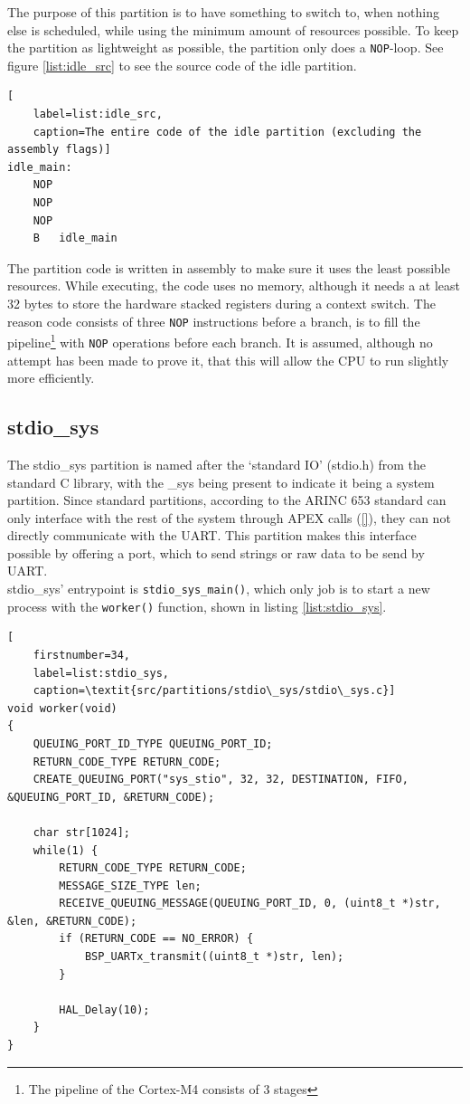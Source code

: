 The purpose of this partition is to have something to switch to, when nothing
else is scheduled, while using the minimum amount of resources possible.
To keep the partition as lightweight as possible, the partition only does a
\texttt{NOP}-loop. See figure \ref{list:idle_src} to see the source code of the
idle partition.\\
\begin {lstlisting}[
	label=list:idle_src,
	caption=The entire code of the idle partition (excluding the assembly flags)]
idle_main:
	NOP
	NOP
	NOP
	B   idle_main
\end{lstlisting}

The partition code is written in assembly to make sure it uses the least possible
resources. While executing, the code uses no memory, although it needs a at
least 32 bytes to store the hardware stacked registers during a context switch.
The reason code consists of three \texttt{NOP} instructions before a branch, is
to fill the pipeline\footnote{The pipeline of the Cortex-M4 consists of 3 stages}
with \texttt{NOP} operations before each branch. It is assumed, although no
attempt has been made to prove it, that this will allow the CPU to run slightly
more efficiently.

\subsection{stdio\_sys}
\label{impl:stdio_sys}
The stdio\_sys partition is named after the `standard IO' (stdio.h) from the
standard C library, with the \_sys being present to indicate it being a system
partition. Since standard partitions, according to the ARINC 653 standard can
only interface with the rest of the system through APEX calls (\ref{}), they can
not directly communicate with the UART. This partition makes this interface
possible by offering a port, which to send strings or raw data to be send by
UART.\\

stdio\_sys' entrypoint is \texttt{stdio\_sys\_main()}, which only job is to
start a new process with the \texttt{worker()} function, shown in listing
\ref{list:stdio_sys}.

\begin{minipage}{\linewidth}
\begin{lstlisting}[
	firstnumber=34,
	label=list:stdio_sys,
	caption=\textit{src/partitions/stdio\_sys/stdio\_sys.c}]
void worker(void)
{
    QUEUING_PORT_ID_TYPE QUEUING_PORT_ID;
    RETURN_CODE_TYPE RETURN_CODE;
    CREATE_QUEUING_PORT("sys_stio", 32, 32, DESTINATION, FIFO, &QUEUING_PORT_ID, &RETURN_CODE);

    char str[1024];
    while(1) {
        RETURN_CODE_TYPE RETURN_CODE;
        MESSAGE_SIZE_TYPE len;
        RECEIVE_QUEUING_MESSAGE(QUEUING_PORT_ID, 0, (uint8_t *)str, &len, &RETURN_CODE);
        if (RETURN_CODE == NO_ERROR) {
            BSP_UARTx_transmit((uint8_t *)str, len);
        }

        HAL_Delay(10);
    }
}
\end{lstlisting}
\end{minipage}

